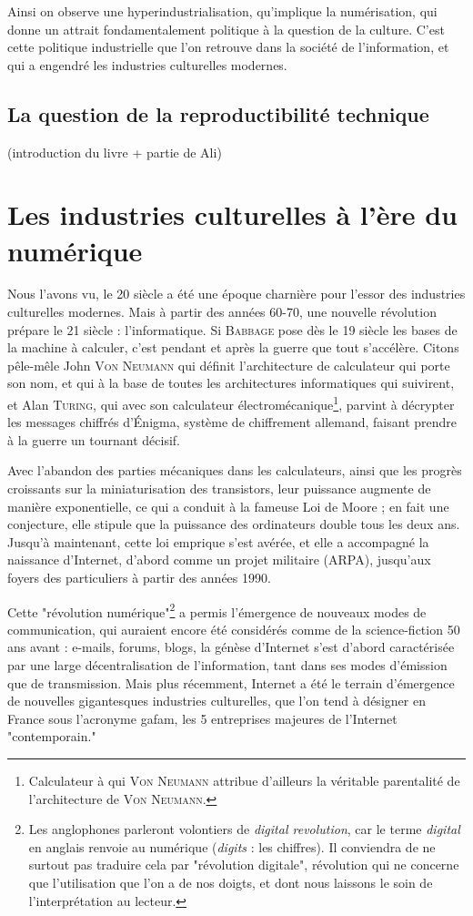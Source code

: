 \documentclass[a4paper,14pt]{extreport}
\begin{document}
Ainsi on observe une hyperindustrialisation, qu'implique la numérisation, qui donne un attrait fondamentalement politique à la question de la culture. C'est cette politique industrielle que l'on retrouve dans la société de l'information, et qui a engendré les industries culturelles modernes.

\subsection{La question de la reproductibilité technique}

(introduction du livre + partie de Ali)

\section{Les industries culturelles à l'ère du numérique}

Nous l'avons vu, le 20 siècle a été une époque charnière pour l'essor des industries culturelles modernes. Mais à partir des années 60-70, une nouvelle révolution prépare le 21 siècle : l'informatique. Si \textsc{Babbage} pose dès le 19 siècle les bases de la machine à calculer, c'est pendant et après la guerre que tout s'accélère. Citons pêle-mêle John \textsc{Von Neumann} qui définit l'architecture de calculateur qui porte son nom, et qui à la base de toutes les architectures informatiques qui suivirent, et Alan \textsc{Turing}, qui avec son calculateur électromécanique\footnote{Calculateur à qui \textsc{Von Neumann} attribue d'ailleurs la véritable parentalité de l'architecture de \textsc{Von Neumann}.}, parvint à décrypter les messages chiffrés d'Énigma, système de chiffrement allemand, faisant prendre à la guerre un tournant décisif.

Avec l'abandon des parties mécaniques dans les calculateurs, ainsi que les progrès croissants sur la miniaturisation des transistors, leur puissance augmente de manière exponentielle, ce qui a conduit à la fameuse Loi de Moore ; en fait une conjecture, elle stipule que la puissance des ordinateurs double tous les deux ans. Jusqu'à maintenant, cette loi emprique s'est avérée, et elle a accompagné la naissance d'Internet, d'abord comme un projet militaire (ARPA), jusqu'aux foyers des particuliers à partir des années 1990.

Cette "révolution numérique"\footnote{Les anglophones parleront volontiers de \textit{digital revolution}, car le terme \textit{digital} en anglais renvoie au numérique (\textit{digits} : les chiffres). Il conviendra de ne surtout pas traduire cela par "révolution digitale", révolution qui ne concerne que l'utilisation que l'on a de nos doigts, et dont nous laissons le soin de l'interprétation au lecteur.} a permis l'émergence de nouveaux modes de communication, qui auraient encore été considérés comme de la science-fiction 50 ans avant : e-mails, forums, blogs, la génèse d'Internet s'est d'abord caractérisée par une large décentralisation de l'information, tant dans ses modes d'émission que de transmission. Mais plus récemment, Internet a été le terrain d'émergence de nouvelles gigantesques industries culturelles, que l'on tend à désigner en France sous l'acronyme \gls{gafam}, les 5 entreprises majeures de l'Internet "contemporain."
\end{document}
